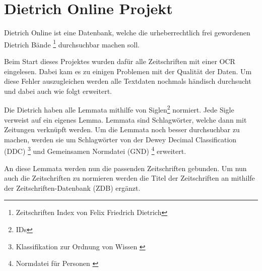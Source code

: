 \chapter{Dietrich Online Projekt}
\label{dietrichonline}

Dietrich Online ist eine Datenbank, welche die urheberrechtlich frei gewordenen Dietrich Bände \footnote{Zeitschriften Index von Felix Friedrich Dietrich} durchsuchbar machen soll. 

Beim Start dieses Projektes wurden dafür alle Zeitschriften mit einer OCR eingelesen. Dabei kam es zu einigen Problemen mit der Qualität der Daten. Um diese Fehler auszugleichen werden alle Textdaten nochmals händisch durchsucht und dabei auch wie folgt erweitert.

Die Dietrich haben alle Lemmata mithilfe von Siglen\footnote{IDs} normiert. Jede Sigle verweist auf ein eigenes Lemma. Lemmata sind Schlagwörter, welche dann mit Zeitungen verknüpft werden. Um die Lemmata noch besser durchsuchbar zu machen, werden sie um Schlagwörter von der Dewey Decimal Classification (DDC)  \footnote{Klassifikation zur Ordnung von Wissen \cite{DeutscheNationalBibliothek.ddc}} und Gemeinsamen Normdatei (GND)  \footnote{Normdatei für Personen \cite{DeutscheNationalBibliothek.2019b}}
erweitert.

An diese Lemmata werden nun die passenden Zeitschriften gebunden. Um nun auch die Zeitschriften zu normieren werden die Titel der Zeitschriften an mithilfe der Zeitschriften-Datenbank (ZDB) ergänzt. 
\cite{UniversityofTrier.2016}